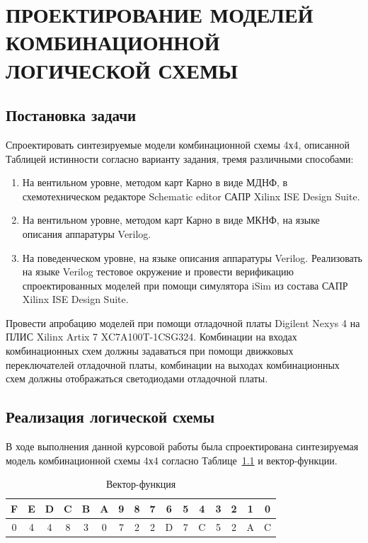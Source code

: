 \chapter{ПРОЕКТИРОВАНИЕ МОДЕЛЕЙ КОМБИНАЦИОННОЙ ЛОГИЧЕСКОЙ СХЕМЫ}

\section {Постановка задачи}
Спроектировать синтезируемые модели комбинационной схемы 4х4, описанной
Таблицей истинности согласно варианту задания, тремя различными способами:
\begin{enumerate}
	\item На вентильном уровне, методом карт Карно в виде МДНФ, в схемотехническом
	редакторе Schematic editor САПР Xilinx ISE Design Suite.
	\item На вентильном уровне, методом карт Карно в виде МКНФ, на языке описания
	аппаратуры Verilog.
	\item На поведенческом уровне, на языке описания аппаратуры Verilog.
	Реализовать на языке Verilog тестовое окружение и провести верификацию
	спроектированных моделей при помощи симулятора iSim из состава
	САПР Xilinx ISE Design Suite.
\end{enumerate}

Провести апробацию моделей при помощи отладочной платы Digilent Nexys 4 на
ПЛИС Xilinx Artix 7 XC7A100T-1CSG324. Комбинации на входах комбинационных схем
должны задаваться при помощи движковых переключателей отладочной платы,
комбинации на выходах комбинационных схем должны отображаться светодиодами
отладочной платы.
\section {Реализация логической схемы}
В ходе выполнения данной курсовой работы была спроектирована синтезируемая модель комбинационной схемы 4х4 согласно Таблице~\ref{tab:func-vector1}  и вектор-функции.

\begin{table}[h!]
	\centering
	\small
		\caption{Вектор-функция}
		\begin{tabular}{|c|c|c|c|c|c|c|c|c|c|c|c|c|c|c|c|}
			\hline
			F & E & D & C & B & A & 9 & 8 & 7 & 6 & 5 & 4 & 3 & 2 & 1 & 0 \\ \hline\hline
			0 & 4 & 4 & 8 & 3 & 0 & 7 & 2 & 2 & D & 7 & C & 5 & 2 & A & C \\ \hline
		\end{tabular}
		\label{tab:func-vector1}
\end{table}
